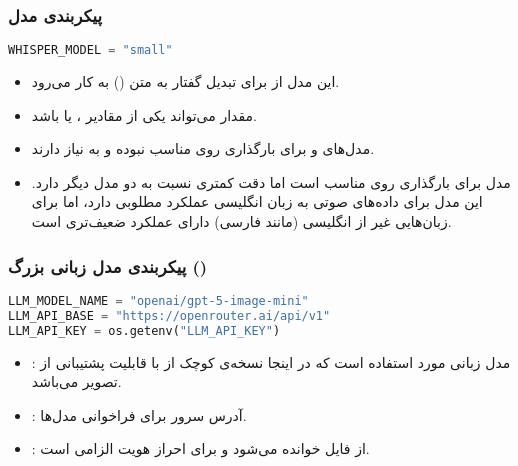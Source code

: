 \documentclass{article}
\begin{document}
\subsubsection{پیکربندی مدل }

\begin{latin}
\begin{lstlisting}[language=Python]
WHISPER_MODEL = "small"
\end{lstlisting}
\end{latin}

\begin{itemize}
    \item این مدل از  برای تبدیل گفتار به متن () به کار می‌رود.
    \item مقدار  می‌تواند یکی از مقادیر ،  یا  باشد.
    \item مدل‌های  و  برای بارگذاری روی  مناسب نبوده و به  نیاز دارند.
    \item مدل  برای بارگذاری روی  مناسب است اما دقت کمتری نسبت به دو مدل دیگر دارد. این مدل برای داده‌های صوتی به زبان انگلیسی عملکرد مطلوبی دارد، اما برای زبان‌هایی غیر از انگلیسی (مانند فارسی) دارای عملکرد ضعیف‌تری است.
\end{itemize}

\subsubsection{پیکربندی مدل زبانی بزرگ ()}

\begin{latin}
\begin{lstlisting}[language=Python]
LLM_MODEL_NAME = "openai/gpt-5-image-mini"
LLM_API_BASE = "https://openrouter.ai/api/v1"
LLM_API_KEY = os.getenv("LLM_API_KEY")
\end{lstlisting}
\end{latin}

\begin{itemize}
    \item {}: مدل زبانی مورد استفاده است که در اینجا نسخه‌ی کوچک از  با قابلیت پشتیبانی از تصویر می‌باشد.
    \item {}: آدرس سرور  برای فراخوانی  مدل‌ها.
    \item {}: از فایل  خوانده می‌شود و برای احراز هویت  الزامی است.
\end{itemize}
\end{document}
